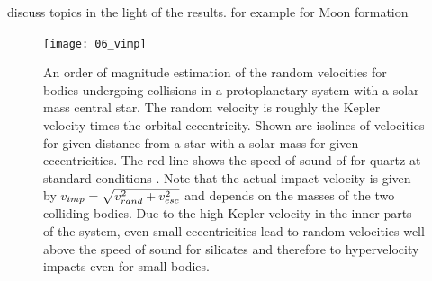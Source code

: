 {discuss topics in the light of the results. for example for Moon formation

\begin{figure}[htbp]
\begin{center}
\texttt{[image: 06\_vimp]}
\caption{An order of magnitude estimation of the random velocities for bodies undergoing collisions in a protoplanetary system with a solar mass central star. The random velocity is roughly the Kepler velocity times the orbital eccentricity. Shown are isolines of velocities for given distance from a star with a solar mass for given eccentricities. The red line shows the speed of sound of for quartz at standard conditions \cite{Melosh:2007p3502}. Note that the actual impact velocity is given by $v_{imp} = \sqrt{ v_{rand}^2 + v_{esc}^2}$ and depends on the masses of the two colliding bodies. Due to the high Kepler velocity in the inner parts of the system, even small eccentricities lead to random velocities well above the speed of sound for silicates and therefore to hypervelocity impacts even for small bodies.}
\label{ch03_fig06}
\end{center}
\end{figure}






	
\cite{Agnor:2004p3329}

\cite{Asphaug:2006p3729}

\cite{Asphaug:2010p3539}


}

